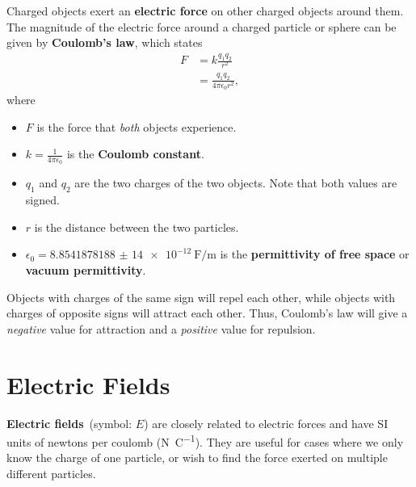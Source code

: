 Charged objects exert an \textbf{electric force} on other charged
objects around them.
The magnitude of the electric force around a charged particle or
sphere can be given by \textbf{Coulomb's law},
which states
\begin{equation} \label{eq:coulombs-law}
    \begin{aligned}
        F &= k \frac{q_1 q_2}{r^2} \\
        &= \frac{q_1 q_2}{4 \pi \epsilon_0 r^2},
    \end{aligned}
\end{equation}
where
\begin{itemize}
    \item \(F\) is the force that \emph{both} objects experience.
    \item \(k = \frac{1}{4 \pi \epsilon_0}\) is the \textbf{Coulomb constant}.
    \item \(q_1\) and \(q_2\) are the two charges of the two objects.
        Note that both values are signed.
    \item \(r\) is the distance between the two particles.
    \item \(\epsilon_0 = \qty{8.854 187 8188(14)e-12}{\farad \per \metre}\)
        is the \textbf{permittivity of free space}
        or \textbf{vacuum permittivity}. \autocite{nist-epsilon_0}
\end{itemize}
Objects with charges of the same sign will repel each other,
while objects with charges of opposite signs will attract each other.
Thus, Coulomb's law will give a \emph{negative} value for attraction
and a \emph{positive} value for repulsion.

\section{Electric Fields}

\textbf{Electric fields}~(symbol: \(E\)) are closely related to electric forces
and have SI units of newtons per coulomb (\unit{\newton \per \coulomb}).
They are useful for cases where we only know the charge of one particle,
or wish to find the force exerted on multiple different particles.

